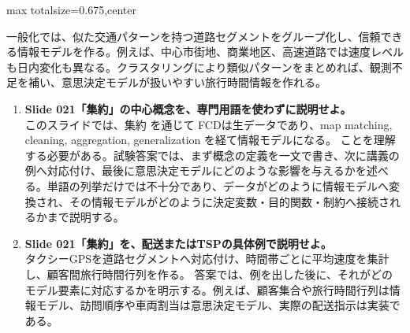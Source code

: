 \begin{adjustbox}{max totalsize={\textwidth}{0.675\textheight},center}
\begin{minipage}{\textwidth}
\begin{minipage}[t]{0.485\textwidth}
一般化では、似た交通パターンを持つ道路セグメントをグループ化し、信頼できる情報モデルを作る。例えば、中心市街地、商業地区、高速道路では速度レベルも日内変化も異なる。クラスタリングにより類似パターンをまとめれば、観測不足を補い、意思決定モデルが扱いやすい旅行時間情報を作れる。\par
{}
\begin{enumerate}
\item \textbf{Slide 021「集約」の中心概念を、専門用語を使わずに説明せよ。}\\このスライドでは、集約 を通じて FCDは生データであり、map matching, cleaning, aggregation, generalization を経て情報モデルになる。 ことを理解する必要がある。試験答案では、まず概念の定義を一文で書き、次に講義の例へ対応付け、最後に意思決定モデルにどのような影響を与えるかを述べる。単語の列挙だけでは不十分であり、データがどのように情報モデルへ変換され、その情報モデルがどのように決定変数・目的関数・制約へ接続されるかまで説明する。
\item \textbf{Slide 021「集約」を、配送またはTSPの具体例で説明せよ。}\\タクシーGPSを道路セグメントへ対応付け、時間帯ごとに平均速度を集計し、顧客間旅行時間行列を作る。 答案では、例を出した後に、それがどのモデル要素に対応するかを明示する。例えば、顧客集合や旅行時間行列は情報モデル、訪問順序や車両割当は意思決定モデル、実際の配送指示は実装である。
\end{enumerate}
\end{minipage}
\end{minipage}
\end{adjustbox}

